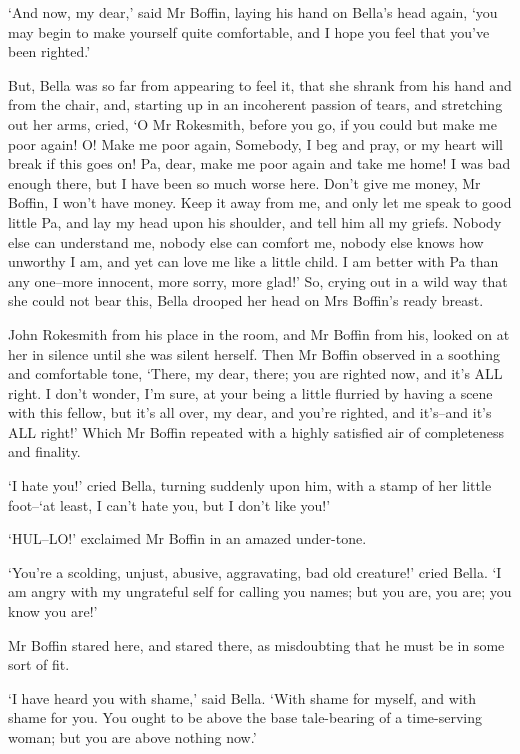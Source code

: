 ‘And now, my dear,’ said Mr Boffin, laying his hand on Bella’s head
again, ‘you may begin to make yourself quite comfortable, and I hope you
feel that you’ve been righted.’

But, Bella was so far from appearing to feel it, that she shrank from
his hand and from the chair, and, starting up in an incoherent passion
of tears, and stretching out her arms, cried, ‘O Mr Rokesmith, before
you go, if you could but make me poor again! O! Make me poor again,
Somebody, I beg and pray, or my heart will break if this goes on! Pa,
dear, make me poor again and take me home! I was bad enough there, but
I have been so much worse here. Don’t give me money, Mr Boffin, I won’t
have money. Keep it away from me, and only let me speak to good little
Pa, and lay my head upon his shoulder, and tell him all my griefs.
Nobody else can understand me, nobody else can comfort me, nobody else
knows how unworthy I am, and yet can love me like a little child. I am
better with Pa than any one--more innocent, more sorry, more glad!’ So,
crying out in a wild way that she could not bear this, Bella drooped her
head on Mrs Boffin’s ready breast.

John Rokesmith from his place in the room, and Mr Boffin from his,
looked on at her in silence until she was silent herself. Then Mr Boffin
observed in a soothing and comfortable tone, ‘There, my dear, there; you
are righted now, and it’s ALL right. I don’t wonder, I’m sure, at your
being a little flurried by having a scene with this fellow, but it’s all
over, my dear, and you’re righted, and it’s--and it’s ALL right!’ Which
Mr Boffin repeated with a highly satisfied air of completeness and
finality.

‘I hate you!’ cried Bella, turning suddenly upon him, with a stamp of
her little foot--‘at least, I can’t hate you, but I don’t like you!’

‘HUL--LO!’ exclaimed Mr Boffin in an amazed under-tone.

‘You’re a scolding, unjust, abusive, aggravating, bad old creature!’
cried Bella. ‘I am angry with my ungrateful self for calling you names;
but you are, you are; you know you are!’

Mr Boffin stared here, and stared there, as misdoubting that he must be
in some sort of fit.

‘I have heard you with shame,’ said Bella. ‘With shame for myself, and
with shame for you. You ought to be above the base tale-bearing of a
time-serving woman; but you are above nothing now.’

